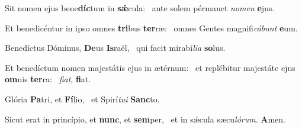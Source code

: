 \item Sit nomen ejus bene\textbf{díc}tum in \textbf{sǽ}cula:~\psstar{} ante solem pérmanet \textit{nomen} \textbf{e}jus.
\item Et benedicéntur in ipso omnes \textbf{tri}bus \textbf{ter}ræ:~\psstar{} omnes Gentes magnifi\textit{cábunt} \textbf{e}um.
\item Benedíctus Dóminus, \textbf{De}us \textbf{Is}raël,~\psstar{} qui facit mirabí\textit{lia} \textbf{so}lus.
\item Et benedíctum nomen majestátis ejus in ætérnum:~\pscross{} et replébitur majestáte ejus \textbf{om}nis \textbf{ter}ra:~\psstar{} \textit{fiat}, \textbf{fi}at.
\item Glória \textbf{Pa}tri, et \textbf{Fí}lio,~\psstar{} et Spirí\textit{tui} \textbf{Sanc}to.
\item Sicut erat in princípio, et \textbf{nunc}, et \textbf{sem}per,~\psstar{} et in sǽcula sæcu\textit{lórum}. \textbf{A}men.